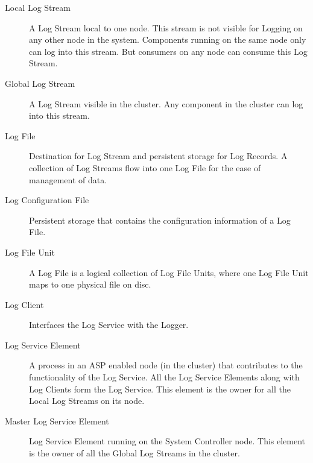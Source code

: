 \begin{flushleft}
\begin{Desc}
\begin{description}

\item[Local Log Stream] A Log Stream local to one node. This stream is not visible for Logging on any other node in the system. Components running on
the same node only can log into this stream. But consumers on any node can consume this Log Stream.
\end{description}


\begin{description}
\item[Global Log Stream] A Log Stream visible in the cluster. Any component in the cluster can log into this stream.
\end{description}

\begin{description}
\item[Log File] Destination for Log Stream and persistent storage for Log Records. A collection of Log Streams flow into one Log File for the ease of 
management of data.
\end{description}


\begin{description}
\item[Log Configuration File] Persistent storage that contains the configuration information of a Log File. 
\end{description}

\begin{description}
\item[Log File Unit] A Log File is a logical collection of Log File Units, where one Log File Unit maps to one physical file on disc.
\end{description}

\begin{description}
\item[Log Client] Interfaces the Log Service with the Logger. 
\end{description}


\begin{description}
\item[Log Service Element] A process in an ASP enabled node (in the cluster) that contributes to the functionality of the Log Service. All the Log 
Service Elements along with Log Clients form the Log Service. This element is the owner for all the Local Log Streams on its node.
\end{description}


\begin{description}
\item[Master Log Service Element] Log Service Element running on the System Controller node. This element is the owner of all the Global Log Streams 
in the cluster.
\end{description}


\end{Desc}
\end{flushleft}

